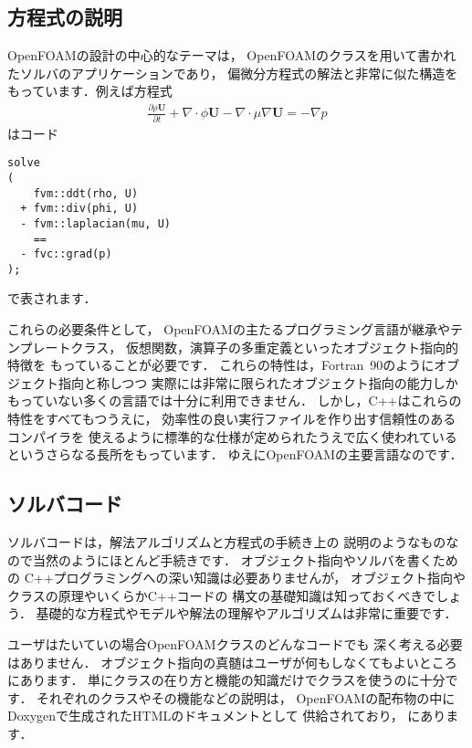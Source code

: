 \subsection{方程式の説明}
\label{ssec:3.1.3}
OpenFOAMの設計の中心的なテーマは，
OpenFOAMのクラスを用いて書かれたソルバのアプリケーションであり，
偏微分方程式の解法と非常に似た構造をもっています．例えば方程式
\begin{align*}
 \frac{\partial\rho\bm{U}}{\partial t} + \nabla \cdot \phi\bm{U}
 - \nabla \cdot \mu\nabla\bm{U} = -\nabla p
\end{align*}
はコード
\begin{OFcode}
\begin{verbatim}
solve
(
    fvm::ddt(rho, U)
  + fvm::div(phi, U)
  - fvm::laplacian(mu, U)
    ==
  - fvc::grad(p)
);
\end{verbatim}
\end{OFcode}
で表されます．

これらの必要条件として，
OpenFOAMの主たるプログラミング言語が継承やテンプレートクラス，
仮想関数，演算子の多重定義といったオブジェクト指向的特徴を
もっていることが必要です．
これらの特性は，Fortran~90のようにオブジェクト指向と称しつつ
実際には非常に限られたオブジェクト指向の能力しか
もっていない多くの言語では十分に利用できません．
しかし，C++はこれらの特性をすべてもつうえに，
効率性の良い実行ファイルを作り出す信頼性のあるコンパイラを
使えるように標準的な仕様が定められたうえで広く使われている
というさらなる長所をもっています．
ゆえにOpenFOAMの主要言語なのです．


\subsection{ソルバコード}
\label{ssec:3.1.4}
ソルバコードは，解法アルゴリズムと方程式の手続き上の
説明のようなものなので当然のようにほとんど手続きです．
オブジェクト指向やソルバを書くための
C++プログラミングへの深い知識は必要ありませんが，
オブジェクト指向やクラスの原理やいくらかC++コードの
構文の基礎知識は知っておくべきでしょう．
基礎的な方程式やモデルや解法の理解やアルゴリズムは非常に重要です．

ユーザはたいていの場合OpenFOAMクラスのどんなコードでも
深く考える必要はありません．
オブジェクト指向の真髄はユーザが何もしなくてもよいところにあります．
単にクラスの在り方と機能の知識だけでクラスを使うのに十分です．
それぞれのクラスやその機能などの説明は，
OpenFOAMの配布物の中にDoxygenで生成されたHTMLのドキュメントとして
供給されており，
にあります．



